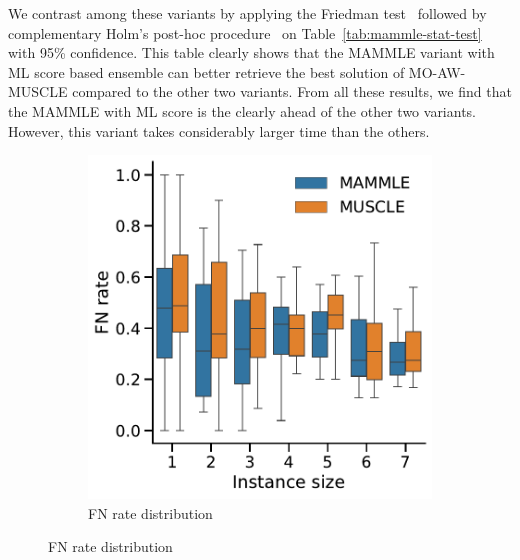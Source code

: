 We contrast among these variants by applying the Friedman test~\cite{friedman1937use} followed by complementary Holm’s post-hoc procedure~\cite{holm1979simple} on Table~\ref{tab:mammle-stat-test} with 95\% confidence. This table clearly shows that the MAMMLE variant with ML score based ensemble can better retrieve the best solution of MO-AW-MUSCLE compared to the other two variants.
From all these results, we find that the MAMMLE with ML score is the clearly ahead of the other two variants. However, this variant takes considerably larger time than the others.
\begin{figure}[!htbp]%
	\begin{adjustwidth}{-1.2cm}{}
		\centering
		\begin{subfigure}{0.40\textwidth} \includegraphics[width=\textwidth]{Figure/comparison-ml} \caption{FN rate distribution} \label{fig:boxplot-ml} \end{subfigure}

\end{adjustwidth}
\end{figure}

